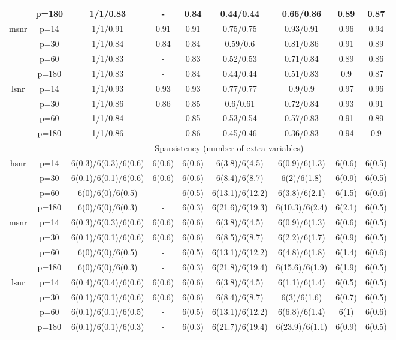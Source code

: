 \begin{table}[ht]
{\begin{tabular}{|c|c|ccccccc|}
   & p=180 & 1/1/0.83 & - & 0.84 & 0.44/0.44 & 0.66/0.86 & 0.89 & 0.87 \\ 
  \midrule\multirow{4}[2]{*}{msnr} & p=14 & 1/1/0.91 & 0.91 & 0.91 & 0.75/0.75 & 0.93/0.91 & 0.96 & 0.94 \\ 
   & p=30 & 1/1/0.84 & 0.84 & 0.84 & 0.59/0.6 & 0.81/0.86 & 0.91 & 0.89 \\ 
   & p=60 & 1/1/0.83 & - & 0.83 & 0.52/0.53 & 0.71/0.84 & 0.89 & 0.86 \\ 
   & p=180 & 1/1/0.83 & - & 0.84 & 0.44/0.44 & 0.51/0.83 & 0.9 & 0.87 \\ 
  \midrule\multirow{4}[2]{*}{lsnr} & p=14 & 1/1/0.93 & 0.93 & 0.93 & 0.77/0.77 & 0.9/0.9 & 0.97 & 0.96 \\ 
   & p=30 & 1/1/0.86 & 0.86 & 0.85 & 0.6/0.61 & 0.72/0.84 & 0.93 & 0.91 \\ 
   & p=60 & 1/1/0.84 & - & 0.85 & 0.53/0.54 & 0.57/0.83 & 0.91 & 0.89 \\ 
   & p=180 & 1/1/0.86 & - & 0.86 & 0.45/0.46 & 0.36/0.83 & 0.94 & 0.9 \\ 
   \midrule 
 \multicolumn{1}{|c}{} &       & \multicolumn{7}{c|}{Sparsistency (number of extra variables)} \\
\midrule\multirow{4}[2]{*}{hsnr} & p=14 & 6(0.3)/6(0.3)/6(0.6) & 6(0.6) & 6(0.6) & 6(3.8)/6(4.5) & 6(0.9)/6(1.3) & 6(0.6) & 6(0.5) \\ 
   & p=30 & 6(0.1)/6(0.1)/6(0.6) & 6(0.6) & 6(0.6) & 6(8.4)/6(8.7) & 6(2)/6(1.8) & 6(0.9) & 6(0.5) \\ 
   & p=60 & 6(0)/6(0)/6(0.5) & - & 6(0.5) & 6(13.1)/6(12.2) & 6(3.8)/6(2.1) & 6(1.5) & 6(0.6) \\ 
   & p=180 & 6(0)/6(0)/6(0.3) & - & 6(0.3) & 6(21.6)/6(19.3) & 6(10.3)/6(2.4) & 6(2.1) & 6(0.5) \\ 
  \midrule\multirow{4}[2]{*}{msnr} & p=14 & 6(0.3)/6(0.3)/6(0.6) & 6(0.6) & 6(0.6) & 6(3.8)/6(4.5) & 6(0.9)/6(1.3) & 6(0.6) & 6(0.5) \\ 
   & p=30 & 6(0.1)/6(0.1)/6(0.6) & 6(0.6) & 6(0.6) & 6(8.5)/6(8.7) & 6(2.2)/6(1.7) & 6(0.9) & 6(0.5) \\ 
   & p=60 & 6(0)/6(0)/6(0.5) & - & 6(0.5) & 6(13.1)/6(12.2) & 6(4.8)/6(1.8) & 6(1.4) & 6(0.6) \\ 
   & p=180 & 6(0)/6(0)/6(0.3) & - & 6(0.3) & 6(21.8)/6(19.4) & 6(15.6)/6(1.9) & 6(1.9) & 6(0.5) \\ 
  \midrule\multirow{4}[2]{*}{lsnr} & p=14 & 6(0.4)/6(0.4)/6(0.6) & 6(0.6) & 6(0.6) & 6(3.8)/6(4.5) & 6(1.1)/6(1.4) & 6(0.5) & 6(0.5) \\ 
   & p=30 & 6(0.1)/6(0.1)/6(0.6) & 6(0.6) & 6(0.6) & 6(8.4)/6(8.7) & 6(3)/6(1.6) & 6(0.7) & 6(0.5) \\ 
   & p=60 & 6(0.1)/6(0.1)/6(0.5) & - & 6(0.5) & 6(13.1)/6(12.2) & 6(6.8)/6(1.4) & 6(1) & 6(0.6) \\ 
   & p=180 & 6(0.1)/6(0.1)/6(0.3) & - & 6(0.3) & 6(21.7)/6(19.4) & 6(23.9)/6(1.1) & 6(0.9) & 6(0.5) \\ 
   \bottomrule 
\end{tabular}
}
\end{table}
